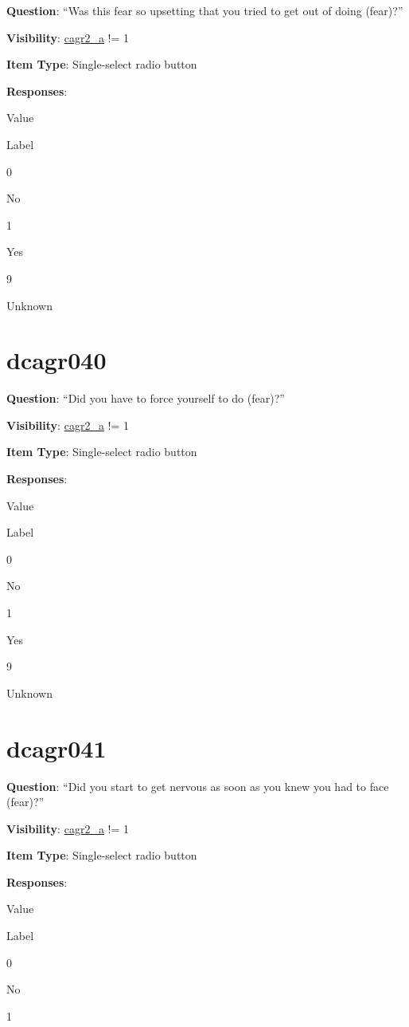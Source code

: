 \documentclass[]{book}
\begin{document}
\textbf{Question}: ``Was this fear so upsetting that you tried to get out of doing (fear)?''

\textbf{Visibility}: \protect\hyperlink{cagr2_a}{cagr2\_a} != 1

\textbf{Item Type}: Single-select radio button

\textbf{Responses}:

Value

Label

0

No

1

Yes

9

Unknown

\hypertarget{dcagr040}{%
\section{dcagr040}\label{dcagr040}}

\textbf{Question}: ``Did you have to force yourself to do (fear)?''

\textbf{Visibility}: \protect\hyperlink{cagr2_a}{cagr2\_a} != 1

\textbf{Item Type}: Single-select radio button

\textbf{Responses}:

Value

Label

0

No

1

Yes

9

Unknown

\hypertarget{dcagr041}{%
\section{dcagr041}\label{dcagr041}}

\textbf{Question}: ``Did you start to get nervous as soon as you knew you had to face (fear)?''

\textbf{Visibility}: \protect\hyperlink{cagr2_a}{cagr2\_a} != 1

\textbf{Item Type}: Single-select radio button

\textbf{Responses}:

Value

Label

0

No

1
\end{document}
